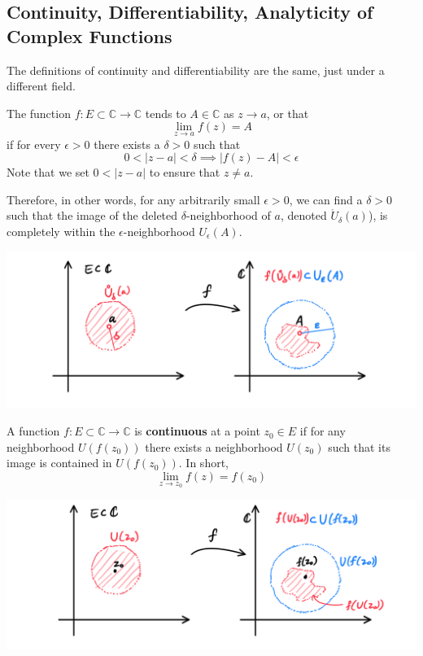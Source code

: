 \documentclass{article}
\begin{document}
    \subsection{Continuity, Differentiability, Analyticity of Complex Functions}

    The definitions of continuity and differentiability are the same, just under a different field. 

    \begin{definition}
      The function $f: E \subset \mathbb{C} \longrightarrow \mathbb{C}$ tends to $A \in \mathbb{C}$ as $z \rightarrow a$, or that
      \[\lim_{z \rightarrow a} f(z) = A\]
      if for every $\epsilon > 0$ there exists a $\delta > 0$ such that
      \[0<|z - a|<\delta \implies |f(z) - A|<\epsilon\]
      Note that we set $0<|z - a|$ to ensure that $z \neq a$. 

      Therefore, in other words, for any arbitrarily small $\epsilon>0$, we can find a $\delta > 0$ such that the image of the deleted $\delta$-neighborhood of $a$, denoted $\mathring{U}_\delta (a)$), is completely within the $\epsilon$-neighborhood $U_\epsilon (A)$. 
      \begin{center}
          \includegraphics[scale=0.25]{img/Limit_of_Complex_Function.PNG}
      \end{center}
    \end{definition}

    \begin{definition}
      A function $f: E \subset \mathbb{C} \longrightarrow \mathbb{C}$ is \textbf{continuous} at a point $z_0 \in E$ if for any neighborhood $U(f(z_0))$ there exists a neighborhood $U(z_0)$ such that its image is contained in $U(f(z_0))$. In short, 
      \[\lim_{z \longrightarrow z_0} f(z) = f(z_0)\]
      \begin{center}
        \includegraphics[scale=0.25]{img/Continuity_of_Complex_Function.PNG}
      \end{center}
    \end{definition}
\end{document}
